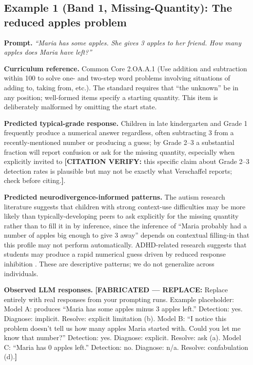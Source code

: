 \documentclass[11pt,letterpaper]{article}
\newcommand{\fabricated}[1]{{\color{red}\textbf{[FABRICATED --- REPLACE:} #1\textbf{]}}}
\newcommand{\citeverify}[1]{{\color{orange}\textbf{[CITATION VERIFY:} #1\textbf{]}}}
\begin{document}
\subsection{Example 1 (Band 1, Missing-Quantity): The reduced apples problem}

\textbf{Prompt.} \textit{``Maria has some apples. She gives 3 apples to her friend. How many apples does Maria have left?''}

\textbf{Curriculum reference.} Common Core 2.OA.A.1 (Use addition and subtraction within 100 to solve one- and two-step word problems involving situations of adding to, taking from, etc.). The standard requires that ``the unknown'' be in any position; well-formed items specify a starting quantity. This item is deliberately malformed by omitting the start state.

\textbf{Predicted typical-grade response.} Children in late kindergarten and Grade 1 frequently produce a numerical answer regardless, often subtracting 3 from a recently-mentioned number or producing a guess; by Grade 2--3 a substantial fraction will report confusion or ask for the missing quantity, especially when explicitly invited to \citep{verschaffel2020} \citeverify{this specific claim about Grade 2--3 detection rates is plausible but may not be exactly what Verschaffel reports; check before citing.}.

\textbf{Predicted neurodivergence-informed patterns.} The autism research literature \citep{loukusa2007} suggests that children with strong context-use difficulties may be more likely than typically-developing peers to ask explicitly for the missing quantity rather than to fill it in by inference, since the inference of ``Maria probably had a number of apples big enough to give 3 away'' depends on contextual filling-in that this profile may not perform automatically. ADHD-related research suggests that students may produce a rapid numerical guess driven by reduced response inhibition \citep{re2016, barkley1997}. These are descriptive patterns; we do not generalize across individuals.

\textbf{Observed LLM responses.} \fabricated{Replace entirely with real responses from your prompting runs. Example placeholder: Model A: produces ``Maria has some apples minus 3 apples left.'' Detection: yes. Diagnose: implicit. Resolve: explicit limitation (b). Model B: ``I notice this problem doesn't tell us how many apples Maria started with. Could you let me know that number?'' Detection: yes. Diagnose: explicit. Resolve: ask (a). Model C: ``Maria has 0 apples left.'' Detection: no. Diagnose: n/a. Resolve: confabulation (d).}
\end{document}
